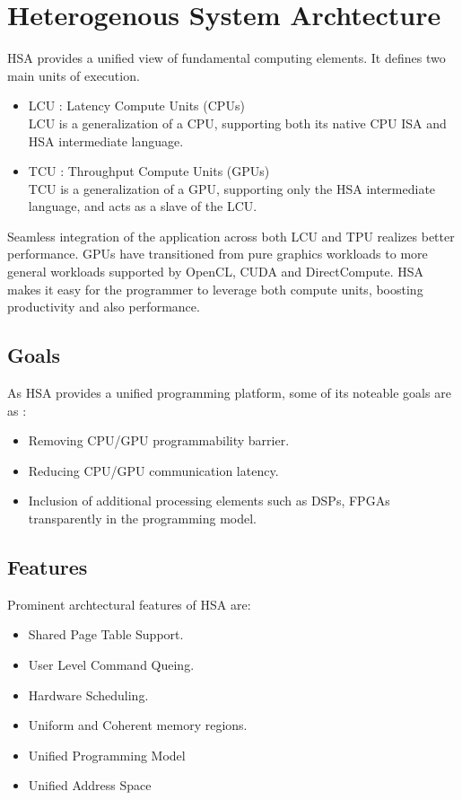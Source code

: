 \section{Heterogenous System Archtecture}

HSA provides a unified view of fundamental computing elements. It defines two
main units of execution.

\begin{itemize}

    \item LCU : Latency Compute Units (CPUs) \\
    LCU is a generalization of a CPU, supporting both its native CPU ISA and HSA intermediate language.
    \item TCU : Throughput Compute Units (GPUs) \\
    TCU is a generalization of a GPU, supporting only the HSA intermediate language, and acts as a slave of the LCU.
    
\end{itemize}

Seamless integration of the application across both LCU and TPU realizes better
performance. GPUs have transitioned from pure graphics workloads to more
general workloads supported by OpenCL, CUDA and DirectCompute. HSA makes it
easy for the programmer to leverage both compute units, boosting productivity
and also performance.

\subsection{Goals}

As HSA provides a unified programming platform, some of its noteable goals are as :

\begin{itemize}

    \item Removing CPU/GPU programmability barrier.
    \item Reducing CPU/GPU communication latency.
    \item Inclusion of additional processing elements such as DSPs, FPGAs transparently in the programming model.

\end{itemize}

\subsection{Features}
Prominent archtectural features of HSA are:

\begin{itemize}

    \item Shared Page Table Support.
    \item User Level Command Queing.
    \item Hardware Scheduling.
    \item Uniform and Coherent memory regions.
    \item Unified Programming Model
    \item Unified Address Space

\end{itemize}
